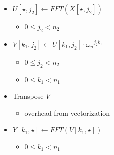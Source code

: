\documentclass[xcolor={x11names,svgnames}]{beamer}
\newcommand{\red}[1]{{\color{red}#1}}
\begin{document}

\begin{frame}[fragile]
  \begin{overlayarea}{\textwidth}{2cm}
      
\end{overlayarea}

\begin{overlayarea}{\textwidth}{8cm}
  \begin{columns}[T]
    \begin{column}{6cm}
      \small 
      \begin{itemize}
      \item<2-> $U[\star, j_2] \gets FFT(X[\star, j_2])$
        \begin{itemize}
        \item $0 \leq j_2 < n_2$
        \end{itemize}

      \item<4-> $V[k_1, j_2] \gets U[k_1, j_2] \cdot {\omega_n}^{j_2 k_1}$
        \begin{itemize}
        \item $0 \leq j_2 < n_2$
        \item $0 \leq k_1 < n_1$ 
        \end{itemize}

      \item<7-> Transpose $V$
        \begin{itemize}
        \item \red{overhead} from vectorization
        \end{itemize}
        
      \item<only@5-6> $Y[k_1, \star] \gets FFT(V[k_1, \star])$
        \begin{itemize}
        \item $0 \leq k_1 < n_1$
        \end{itemize}


\end{itemize}
\end{column}
\end{columns}
\end{overlayarea}
\end{frame}
\end{document}
